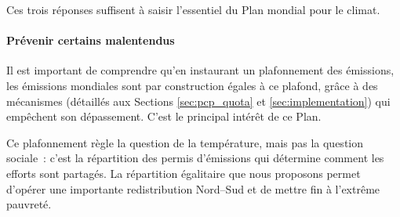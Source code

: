 \documentclass[a5paper,french,openany]{memoir}
\begin{document}
Ces trois réponses suffisent à saisir l'essentiel du Plan mondial pour le climat.

\paragraph{Prévenir certains malentendus}
Il est important de comprendre qu'en instaurant un plafonnement des émissions, les émissions mondiales sont par construction égales à ce plafond, grâce à des mécanismes (détaillés aux Sections \ref{sec:pcp_quota} et \ref{sec:implementation}) qui empêchent son dépassement. C'est le principal intérêt de ce Plan.

Ce plafonnement règle la question de la température, %
mais pas la question sociale~: c'est la répartition des permis d'émissions qui détermine comment les efforts sont partagés. La répartition égalitaire que nous proposons permet d'opérer une importante redistribution Nord--Sud et de mettre fin à l'extrême pauvreté. 
\end{document}
